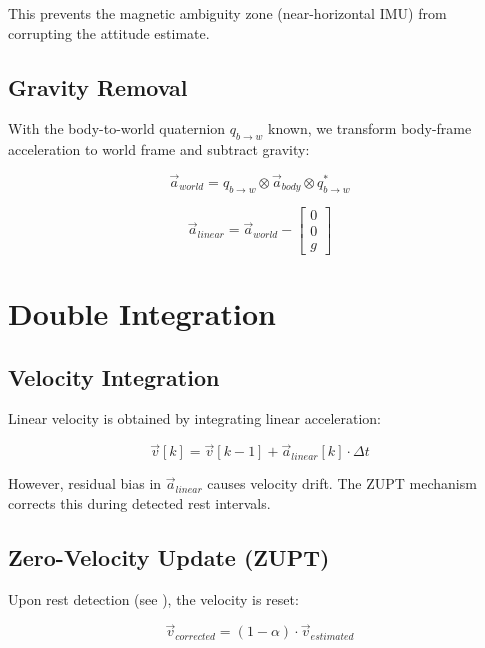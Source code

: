 This prevents the magnetic ambiguity zone (near-horizontal IMU) from corrupting the attitude estimate.

\subsection{Gravity Removal}

With the body-to-world quaternion $q_{b\to w}$ known, we transform body-frame acceleration to world frame and subtract gravity:

\begin{equation}
    \vec{a}_{world} = q_{b\to w} \otimes \vec{a}_{body} \otimes q_{b\to w}^*
\end{equation}

\begin{equation}
    \vec{a}_{linear} = \vec{a}_{world} - \begin{bmatrix} 0 \\ 0 \\ g \end{bmatrix}
\end{equation}

\section{Double Integration}

\subsection{Velocity Integration}

Linear velocity is obtained by integrating linear acceleration:

\begin{equation}
    \vec{v}[k] = \vec{v}[k-1] + \vec{a}_{linear}[k] \cdot \Delta t
\end{equation}

However, residual bias in $\vec{a}_{linear}$ causes velocity drift. The ZUPT mechanism corrects this during detected rest intervals.

\subsection{Zero-Velocity Update (ZUPT)}

Upon rest detection (see ), the velocity is reset:

\begin{equation}
    \vec{v}_{corrected} = (1 - \alpha) \cdot \vec{v}_{estimated}
\end{equation}

